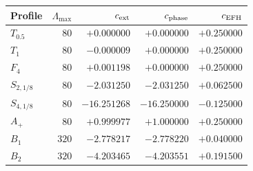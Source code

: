 \begin{tabular}{@{}lrrrr@{}}
\toprule
Profile & $\Lambda_{\max}$ & $c_{\mathrm{ext}}$ & $c_{\mathrm{phase}}$ & $c_{\mathrm{EFH}}$ \\
\midrule
$T_{0.5}$ & $80$ & $+0.000000$ & $+0.000000$ & $+0.250000$ \\
$T_1$ & $80$ & $-0.000009$ & $+0.000000$ & $+0.250000$ \\
$F_4$ & $80$ & $+0.001198$ & $+0.000000$ & $+0.250000$ \\
$S_{2,1/8}$ & $80$ & $-2.031250$ & $-2.031250$ & $+0.062500$ \\
$S_{4,1/8}$ & $80$ & $-16.251268$ & $-16.250000$ & $-0.125000$ \\
$A_+$ & $80$ & $+0.999977$ & $+1.000000$ & $+0.250000$ \\
$B_1$ & $320$ & $-2.778217$ & $-2.778220$ & $+0.040000$ \\
$B_2$ & $320$ & $-4.203465$ & $-4.203551$ & $+0.191500$ \\
\bottomrule
\end{tabular}
